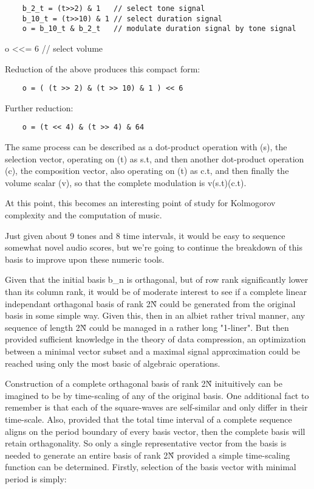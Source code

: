 \documentclass[11pt]{book}
\begin{document}
\begin{verbatim}
	b_2_t = (t>>2) & 1   // select tone signal
	b_10_t = (t>>10) & 1 // select duration signal
	o = b_10_t & b_2_t   // modulate duration signal by tone signal
\end{verbatim}
	o <<= 6              // select volume

Reduction of the above produces this compact form:

\begin{verbatim}
	o = ( (t >> 2) & (t >> 10) & 1 ) << 6
\end{verbatim}

Further reduction:

\begin{verbatim}
	o = (t << 4) & (t >> 4) & 64
\end{verbatim}

The same process can be described as a dot-product operation with (s), the selection vector, operating on (t) as s.t,
and then another dot-product operation (c), the composition vector, also operating on (t) as c.t, and then finally the
volume scalar (v), so that the complete modulation is v(s.t)(c.t).

At this point, this becomes an interesting point of study for Kolmogorov complexity and the computation of music.

Just given about 9 tones and 8 time intervals, it would be easy to sequence somewhat novel audio scores, but we're going to continue
the breakdown of this basis to improve upon these numeric tools.

Given that the initial basis b\_n is orthagonal, but of row rank significantly lower than its column rank, it would be of moderate interest
to see if a complete linear independant orthagonal basis of rank 2\^N could be generated from the original basis in some simple way. Given this,
then in an albiet rather trival manner, any sequence of length 2\^N could be managed in a rather long "1-liner". But then provided sufficient
knowledge in the theory of data compression, an optimization between a minimal vector subset and a maximal signal approximation could be reached
using only the most basic of algebraic operations.

Construction of a complete orthagonal basis of rank 2\^N inituitively can be imagined to be by time-scaling of any of the original basis. One
additional fact to remember is that each of the square-waves are self-similar and only differ in their time-scale. Also, provided that the total
time interval of a complete sequence aligns on the period boundary of every basis vector, then the complete basis will retain orthagonality.
So only a single representative vector from the basis is needed to generate an entire basis of rank 2\^N provided a simple time-scaling function
can be determined. Firstly, selection of the basis vector with minimal period is simply:
\end{document}
